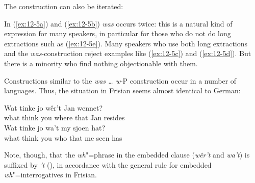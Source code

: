 \documentclass[output=paper]{langsci/langscibook}
\begin{document}
The construction can also be iterated:
\begin{exe}
\judgewidth{\%}
\ex
\label{ex:12-5}
\begin{xlist}
\end{xlist}
\end{exe}
In (\ref{ex:12-5a}) and (\ref{ex:12-5b}) \textit{was} occurs twice: this is a natural kind
of expression for many speakers, in particular for those who do not do
long extractions such as (\ref{ex:12-5e}). Many speakers who use both long
extractions and the \textit{was}-construction reject  examples
like (\ref{ex:12-5c}) and (\ref{ex:12-5d}). But there is a minority who find nothing
objectionable with them.
        
Constructions similar to the \textit{was \ldots{}  w}-P construction occur
in a number of languages. Thus, the situation in Frisian seems almost
identical to German:
\begin{exe}
\ex
\label{ex:12-6}
\begin{xlist}
\ex
\label{ex:12-6a}
\gll
Wat tinke jo w\^er't Jan wennet? \\
what think you {where that} Jan resides \\
\ex
\label{ex:12-6b}
\gll
Wat tinke jo wa't my sjoen hat? \\
what think you {who that} me seen has \\
\end{xlist}        
\end{exe}
Note, though, that the \emph{wh}"=phrase in the embedded clause (\textit{w\^er't} and  \textit{wa't}) is
suffixed by  \textit{'t} (), in accordance with the general rule for embedded
\emph{wh}"=interrogatives in Frisian.
\end{document}
